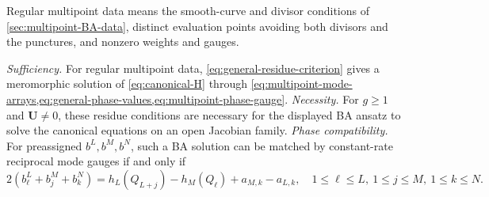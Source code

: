 Regular multipoint data means the smooth-curve and divisor
conditions of \cref{sec:multipoint-BA-data}, distinct evaluation points
avoiding both divisors and the punctures, and nonzero weights and gauges.

\begin{theorem}\label{thm:general-BA-realization}
\emph{Sufficiency.} For regular multipoint data, \cref{eq:general-residue-criterion} gives
a meromorphic solution of \cref{eq:canonical-H} through
\cref{eq:multipoint-mode-arrays,eq:general-phase-values,eq:multipoint-phase-gauge}.
\emph{Necessity.} For $g\geq1$ and $\boldsymbol U\ne0$, these residue
conditions are necessary for the displayed BA ansatz to solve the
canonical equations on an open Jacobian family.
\emph{Phase compatibility.} For preassigned $b^L,b^M,b^N$, such a BA solution
can be matched by constant-rate reciprocal mode gauges if and only if
\begin{equation}\label{eq:multipoint-phase-compatibility}
 2(b_{\ell}^L+b_j^M+b_k^N)
 =h_L(Q_{L+j})-h_M(Q_{\ell})+a_{M,k}-a_{L,k},
 \quad1\leq\ell\leq L,\ 1\leq j\leq M,\ 1\leq k\leq N.
\end{equation}
\end{theorem}
